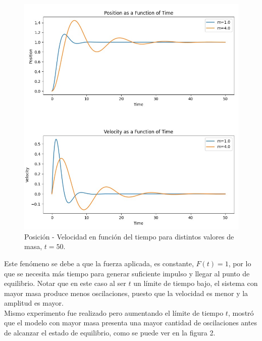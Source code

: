 \documentclass[]{article}
\begin{document}
\begin{figure}[H]
\centering
\includegraphics[width=\textwidth]{../assets/figure_1_mass.jpeg}
\caption{Posición - Velocidad en función del tiempo para distintos valores de masa, $t = 50$.}
\end{figure}


Este fenómeno se debe a que la fuerza aplicada, es constante, $F(t) = 1$, por lo que se necesita más tiempo para generar suficiente impulso y llegar al punto de equilibrio. Notar que en este caso al ser $t$ un límite de tiempo bajo, el sistema con mayor masa produce menos oscilaciones, puesto que la velocidad es menor y la amplitud es mayor.\\

Mismo experimento fue realizado pero aumentando el límite de tiempo 
$t$, mostró que el modelo con mayor masa presenta una mayor cantidad de oscilaciones antes de alcanzar el estado de equilibrio, como se puede ver en la figura 2.
\end{document}
